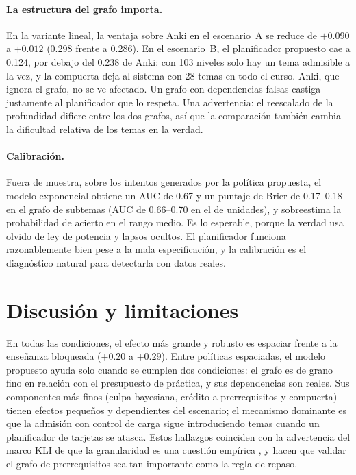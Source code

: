 \documentclass[runningheads]{llncs}
\begin{document}
\paragraph{La estructura del grafo importa.} En la variante lineal, la ventaja sobre Anki en el escenario~A se reduce de $+0.090$ a $+0.012$ (0.298 frente a 0.286). En el escenario~B, el planificador propuesto cae a 0.124, por debajo del 0.238 de Anki: con 103 niveles solo hay un tema admisible a la vez, y la compuerta deja al sistema con 28 temas en todo el curso. Anki, que ignora el grafo, no se ve afectado. Un grafo con dependencias falsas castiga justamente al planificador que lo respeta. Una advertencia: el reescalado de la profundidad difiere entre los dos grafos, así que la comparación también cambia la dificultad relativa de los temas en la verdad.

\paragraph{Calibración.} Fuera de muestra, sobre los intentos generados por la política propuesta, el modelo exponencial obtiene un AUC de 0.67 y un puntaje de Brier de 0.17--0.18 en el grafo de subtemas (AUC de 0.66--0.70 en el de unidades), y sobreestima la probabilidad de acierto en el rango medio. Es lo esperable, porque la verdad usa olvido de ley de potencia y lapsos ocultos. El planificador funciona razonablemente bien pese a la mala especificación, y la calibración es el diagnóstico natural para detectarla con datos reales.

\section{Discusión y limitaciones}

En todas las condiciones, el efecto más grande y robusto es espaciar frente a la enseñanza bloqueada ($+0.20$ a $+0.29$). Entre políticas espaciadas, el modelo propuesto ayuda solo cuando se cumplen dos condiciones: el grafo es de grano fino en relación con el presupuesto de práctica, y sus dependencias son reales. Sus componentes más finos (culpa bayesiana, crédito a prerrequisitos y compuerta) tienen efectos pequeños y dependientes del escenario; el mecanismo dominante es que la admisión con control de carga sigue introduciendo temas cuando un planificador de tarjetas se atasca. Estos hallazgos coinciden con la advertencia del marco KLI de que la granularidad es una cuestión empírica \cite{koedinger2012}, y hacen que validar el grafo de prerrequisitos sea tan importante como la regla de repaso.
\end{document}
